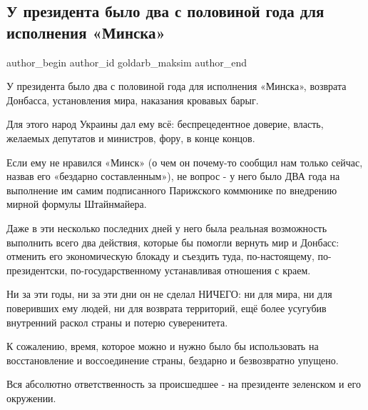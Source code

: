  
 
 
 
 
 
\subsection{У президента было два с половиной года для исполнения «Минска»}
\label{sec:22_02_2022.fb.goldarb_maksim.1.prezident_minsk}
 
\ifcmt
 author_begin
   author_id goldarb_maksim
 author_end
\fi

У президента было два с половиной года для исполнения «Минска», возврата
Донбасса, установления мира, наказания кровавых барыг. 

Для этого народ Украины дал ему всё: беспрецедентное доверие, власть, желаемых
депутатов и министров, фору, в конце концов. 

Если ему не нравился «Минск» (о чем он почему-то сообщил нам только сейчас,
назвав его «бездарно составленным»), не вопрос - у него было ДВА года на
выполнение им самим подписанного Парижского коммюнике по внедрению мирной
формулы Штайнмайера. 

Даже в эти несколько последних дней у него была реальная возможность выполнить
всего два действия, которые бы помогли вернуть мир и Донбасс: отменить его
экономическую блокаду и съездить туда, по-настоящему, по-президентски,
по-государственному устанавливая отношения с краем. 

Ни за эти годы, ни за эти дни он не сделал НИЧЕГО: ни для мира, ни для
поверивших ему людей, ни для возврата территорий, ещё более усугубив внутренний
раскол страны и потерю суверенитета. 

К сожалению, время, которое можно и нужно было бы использовать на
восстановление и воссоединение страны, бездарно и безвозвратно упущено. 

Вся абсолютно ответственность за происшедшее - на президенте зеленском и его
окружении.
